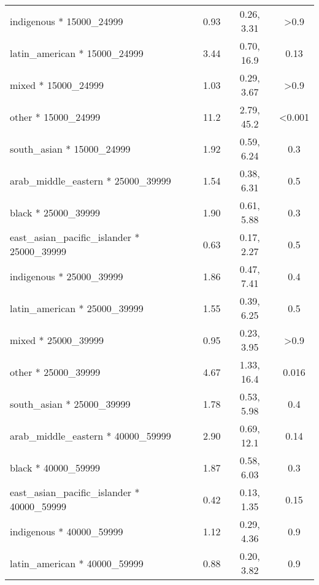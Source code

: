 \documentclass[
  letterpaper,
  DIV=11,
  numbers=noendperiod]{scrartcl}
\begin{document}
\begin{longtable}{lccc}
\addlinespace
\hspace{1em}indigenous * 15000\_24999 & 0.93 & 0.26, 3.31 & >0.9\\
\hspace{1em}latin\_american * 15000\_24999 & 3.44 & 0.70, 16.9 & 0.13\\
\hspace{1em}mixed * 15000\_24999 & 1.03 & 0.29, 3.67 & >0.9\\
\hspace{1em}other * 15000\_24999 & 11.2 & 2.79, 45.2 & <0.001\\
\hspace{1em}south\_asian * 15000\_24999 & 1.92 & 0.59, 6.24 & 0.3\\
\addlinespace
\hspace{1em}arab\_middle\_eastern * 25000\_39999 & 1.54 & 0.38, 6.31 & 0.5\\
\hspace{1em}black * 25000\_39999 & 1.90 & 0.61, 5.88 & 0.3\\
\hspace{1em}east\_asian\_pacific\_islander * 25000\_39999 & 0.63 & 0.17, 2.27 & 0.5\\
\hspace{1em}indigenous * 25000\_39999 & 1.86 & 0.47, 7.41 & 0.4\\
\hspace{1em}latin\_american * 25000\_39999 & 1.55 & 0.39, 6.25 & 0.5\\
\addlinespace
\hspace{1em}mixed * 25000\_39999 & 0.95 & 0.23, 3.95 & >0.9\\
\hspace{1em}other * 25000\_39999 & 4.67 & 1.33, 16.4 & 0.016\\
\hspace{1em}south\_asian * 25000\_39999 & 1.78 & 0.53, 5.98 & 0.4\\
\hspace{1em}arab\_middle\_eastern * 40000\_59999 & 2.90 & 0.69, 12.1 & 0.14\\
\hspace{1em}black * 40000\_59999 & 1.87 & 0.58, 6.03 & 0.3\\
\addlinespace
\hspace{1em}east\_asian\_pacific\_islander * 40000\_59999 & 0.42 & 0.13, 1.35 & 0.15\\
\hspace{1em}indigenous * 40000\_59999 & 1.12 & 0.29, 4.36 & 0.9\\
\hspace{1em}latin\_american * 40000\_59999 & 0.88 & 0.20, 3.82 & 0.9\\

\end{longtable}
\end{document}
